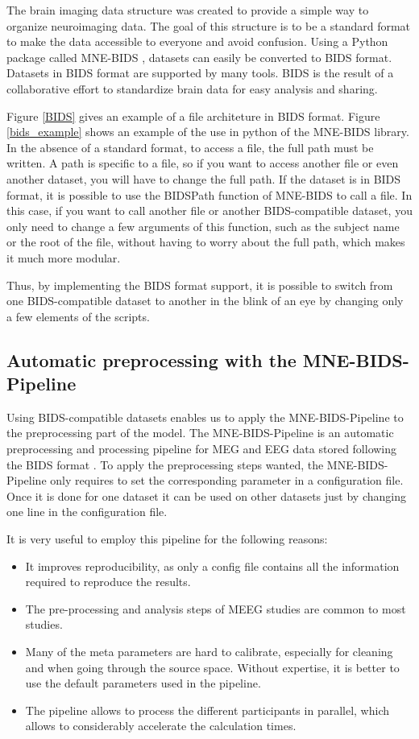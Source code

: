 The brain imaging data structure was created to provide a simple way to organize neuroimaging data. The goal of this structure is to be a standard format to make the data accessible to everyone and avoid confusion. Using a Python package called MNE-BIDS \cite{appelhoff2019mne}, datasets can easily be converted to BIDS format. Datasets in BIDS format are supported by many tools. BIDS is the result of a collaborative effort to standardize brain data for easy analysis and sharing.

Figure \ref{BIDS} gives an example of a file architeture in BIDS format. Figure \ref{bids_example} shows an example of the use in python of the MNE-BIDS library. In the absence of a standard format, to access a file, the full path must be written. A path is specific to a file, so if you want to access another file or even another dataset, you will have to change the full path. If the dataset is in BIDS format, it is possible to use the BIDSPath function of MNE-BIDS to call a file. In this case, if you want to call another file or another BIDS-compatible dataset, you only need to change a few arguments of this function, such as the subject name or the root of the file, without having to worry about the full path, which makes it much more modular.

Thus, by implementing the BIDS format support, it is possible to switch from one BIDS-compatible dataset to another in the blink of an eye by changing only a few elements of the scripts.

\subsection{Automatic preprocessing with the MNE-BIDS-Pipeline}

Using BIDS-compatible datasets enables us to apply the MNE-BIDS-Pipeline to the preprocessing part of the model. The MNE-BIDS-Pipeline is an automatic preprocessing and processing pipeline for MEG and EEG data stored following the BIDS format \cite{gorgolewski2016brain}. To apply the preprocessing steps wanted, the MNE-BIDS-Pipeline only requires to set the corresponding parameter in a configuration file. Once it is done for one dataset it can be used on other datasets just by changing one line in the configuration file.

It is very useful to employ this pipeline for the following reasons:
\begin{itemize}
    \item It improves reproducibility, as only a config file contains all the information required to reproduce the results.
    \item The pre-processing and analysis steps of MEEG studies are common to most studies.
    \item Many of the meta parameters are hard to calibrate, especially for cleaning and when going through the source space. Without expertise, it is better to use the default parameters used in the pipeline.
    \item The pipeline allows to process the different participants in parallel, which allows to considerably accelerate the calculation times.
\end{itemize}
